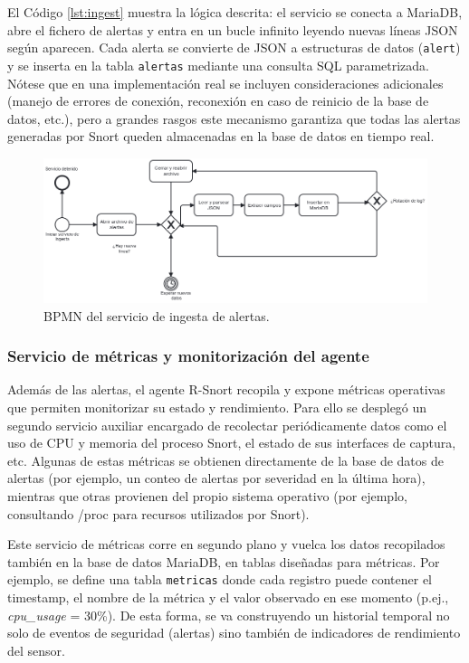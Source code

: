 \documentclass[11pt,a4paper,twoside]{report}
\begin{document}
El Código \ref{lst:ingest} muestra la lógica descrita: el servicio se conecta a MariaDB, abre el fichero de alertas y entra en un bucle infinito leyendo nuevas líneas JSON según aparecen. Cada alerta se convierte de JSON a estructuras de datos (\texttt{alert}) y se inserta en la tabla \texttt{alertas} mediante una consulta SQL parametrizada. Nótese que en una implementación real se incluyen consideraciones adicionales (manejo de errores de conexión, reconexión en caso de reinicio de la base de datos, etc.), pero a grandes rasgos este mecanismo garantiza que todas las alertas generadas por Snort queden almacenadas en la base de datos en tiempo real.

\begin{figure}[H]
	\centering
	\includegraphics[width=1\textwidth]{documento/23.png}
	\caption{BPMN del servicio de ingesta de alertas.}
	\label{fig:bpmn-servicio-ingesta}
\end{figure}

\subsubsection{Servicio de métricas y monitorización del agente}

Además de las alertas, el agente R-Snort recopila y expone métricas operativas que permiten monitorizar su estado y rendimiento. Para ello se desplegó un segundo servicio auxiliar encargado de recolectar periódicamente datos como el uso de CPU y memoria del proceso Snort, el estado de sus interfaces de captura, etc. Algunas de estas métricas se obtienen directamente de la base de datos de alertas (por ejemplo, un conteo de alertas por severidad en la última hora), mientras que otras provienen del propio sistema operativo (por ejemplo, consultando /proc para recursos utilizados por Snort).\newline

Este servicio de métricas corre en segundo plano y vuelca los datos recopilados también en la base de datos MariaDB, en tablas diseñadas para métricas. Por ejemplo, se define una tabla \texttt{metricas} donde cada registro puede contener el timestamp, el nombre de la métrica y el valor observado en ese momento (p.ej., \textit{cpu\_usage} = 30\%). De esta forma, se va construyendo un historial temporal no solo de eventos de seguridad (alertas) sino también de indicadores de rendimiento del sensor.\newline
\end{document}
